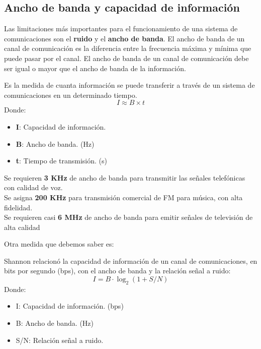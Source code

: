 \documentclass[
	12pt, %
	fleqn, %
	a4paper, %
	oneside, %
]{LegrandOrangeBook}
\begin{document}
\subsection{Ancho de banda y capacidad de información}
Las limitaciones más importantes para el funcionamiento de una sistema de comunicaciones son el \textbf{ruido} y el \textbf{ancho de banda}. El ancho de banda de un canal de comunicación es la diferencia entre la frecuencia máxima y mínima que puede pasar por el canal. El ancho de banda de un canal de comunicación debe ser igual o mayor que el ancho de banda de la información.
\begin{definition}
Es la medida de cuanta información se puede transferir a través de un sistema de comunicaciones en un determinado tiempo.
\begin{equation}
I\approx B\times t
\label{eq:hartley}
\end{equation}
Donde:
\begin{itemize}
\item \textbf{I}: Capacidad de información.
\item \textbf{B}: Ancho de banda. (Hz)
\item \textbf{t}: Tiempo de transmisión. (s)
\end{itemize}
\end{definition}
\begin{notation}
Se requieren \textbf{3 KHz} de ancho de banda para transmitir las señales telefónicas con calidad de voz.\\
Se asigna \textbf{200 KHz} para transmisión comercial de FM para música, con alta fidelidad.\\
Se requieren casi \textbf{6 MHz} de ancho de banda para emitir señales de televisión de alta calidad
\end{notation}
Otra medida que debemos saber es:
\begin{definition}
Shannon relacionó la capacidad de información de un canal de comunicaciones, en bits por segundo (bps), con el ancho de banda y la relación señal a ruido: 
\begin{equation}
I=B\cdot\log_2(1+S/N)
\label{eq:shannon}
\end{equation}
Donde:
\begin{itemize}
\item I: Capacidad de información. (bps)
\item B: Ancho de banda. (Hz)
\item S/N: Relación señal a ruido.
\end{itemize}
\end{definition}
\end{document}
